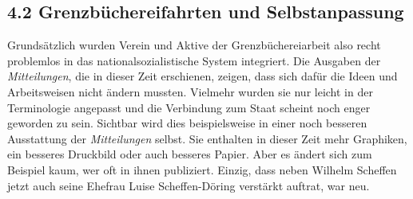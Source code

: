 \documentclass[a4paper,
fontsize=11pt,
oneside,
numbers=noperiodatend,
parskip=half-,
bibliography=totoc,
final
]{scrartcl}
\begin{document}
\hypertarget{grenzbuxfcchereifahrten-und-selbstanpassung}{%
\subsection{4.2 Grenzbüchereifahrten und
Selbstanpassung}\label{grenzbuxfcchereifahrten-und-selbstanpassung}}

Grundsätzlich wurden Verein und Aktive der Grenzbüchereiarbeit also
recht problemlos in das nationalsozialistische System integriert. Die
Ausgaben der \emph{Mitteilungen}, die in dieser Zeit erschienen, zeigen,
dass sich dafür die Ideen und Arbeitsweisen nicht ändern mussten.
Vielmehr wurden sie nur leicht in der Terminologie angepasst und die
Verbindung zum Staat scheint noch enger geworden zu sein. Sichtbar wird
dies beispielsweise in einer noch besseren Ausstattung der
\emph{Mitteilungen} selbst. Sie enthalten in dieser Zeit mehr Graphiken,
ein besseres Druckbild oder auch besseres Papier. Aber es ändert sich
zum Beispiel kaum, wer oft in ihnen publiziert. Einzig, dass neben
Wilhelm Scheffen jetzt auch seine Ehefrau Luise Scheffen-Döring
verstärkt auftrat, war neu.
\end{document}
